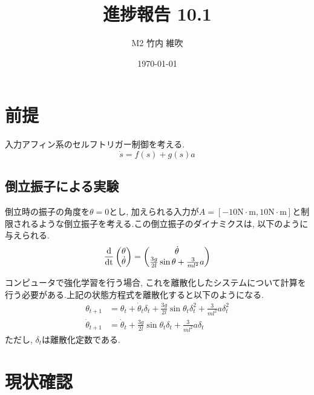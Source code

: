 \documentclass{jsarticle}
\title{\large{\bf{進捗報告 10.1}}}
\author{M2 竹内 維吹}
\date{\today}
\newcommand{\odif}[2]{\frac{\rm{d}#1}{\rm{d}#2}}
\begin{document}
\maketitle


\section{前提}
入力アフィン系のセルフトリガー制御を考える. 
\begin{equation}
	\dot{s} = f(s) + g(s)a \label{continuous}
\end{equation}

\subsection{倒立振子による実験}
倒立時の振子の角度を$\theta=0$とし, 加えられる入力が$A=[-10\textrm{N}\cdot\textrm{m},10\textrm{N}\cdot\textrm{m}]$と制限されるような倒立振子を考える.この倒立振子のダイナミクスは, 以下のように与えられる.
\begin{equation}
	\odif{}{t}\begin{pmatrix}\theta \\ \dot{\theta}\end{pmatrix} = 
		\begin{pmatrix}\dot{\theta} \\ \frac{3g}{2l}\sin{\theta} + \frac{3}{ml^2}a \end{pmatrix} \label{pendulum}
\end{equation}

コンピュータで強化学習を行う場合, これを離散化したシステムについて計算を行う必要がある.上記の状態方程式を離散化すると以下のようになる.
\begin{align}
	\theta_{t+1} &= \theta_t+\dot{\theta}_t\delta_t+\frac{3g}{2l}\sin{\theta_t}\delta_t^2+\frac{3}{ml^2}a\delta_t^2 \tag{3a}\\
	\dot{\theta}_{t+1} &=  \dot{\theta}_t+\frac{3g}{2l}\sin{\theta_t}\delta_t+\frac{3}{ml^2}a\delta_t \tag{3b}
\end{align}\label{pend}
\setcounter{equation}{3}
ただし, $\delta_t$は離散化定数である.\par


\section{現状確認}
\end{document}
